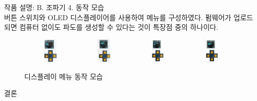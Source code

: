 \documentclass[Junlampaper, portrait]{Julam_PosterK}
\begin{document}
\begin{poster}
\begin{posterbox}[name=circuit,column=1,below=wtank, above=bottom]{작품 설명: B. 조파기}
\small {4. 동작 모습}\\
    \scriptsize {버튼 스위치와 OLED 디스플레이어를 사용하여 메뉴를 구성하였다. 펌웨어가 업로드 되면 컴퓨터 없이도 파도를 생성할 수 있다는 것이 특장점 중의 하나이다. }
    \begin{figure}[H]
            \includegraphics[trim=30 1050 100 0, clip, width=0.24\textwidth, height=1.2cm]{images/OLED1.png} 
            \includegraphics[trim=100 1550 100 0, clip, width=0.24\textwidth, height=1.2cm]{images/OLED2.png}
            \includegraphics[trim=30 950 150 0,clip, width=0.24\textwidth, height=1.2cm]{images/OLED3.png}
            \includegraphics[trim=30 950 100 0, clip, width=0.24\textwidth, height=1.2cm]{images/OLED4.png}
        \caption{디스플레이 메뉴 동작 모습}
        \label{Oled}   
    \end{figure} 
    
\end{posterbox}

\begin{posterbox}[name=result,column=3,]{결론  }


\end{posterbox}
\end{poster}
\end{document}
